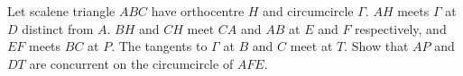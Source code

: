 Let scalene triangle $ABC$ have orthocentre $H$ and circumcircle $\Gamma$. $AH$ meets $\Gamma$ at $D$ distinct from $A$. $BH$ and $CH$ meet $CA$ and $AB$ at $E$ and $F$ respectively, and $EF$ meets $BC$ at $P$. The tangents to $\Gamma$ at $B$ and $C$ meet at $T$. Show that $AP$ and $DT$ are concurrent on the circumcircle of $AFE$.